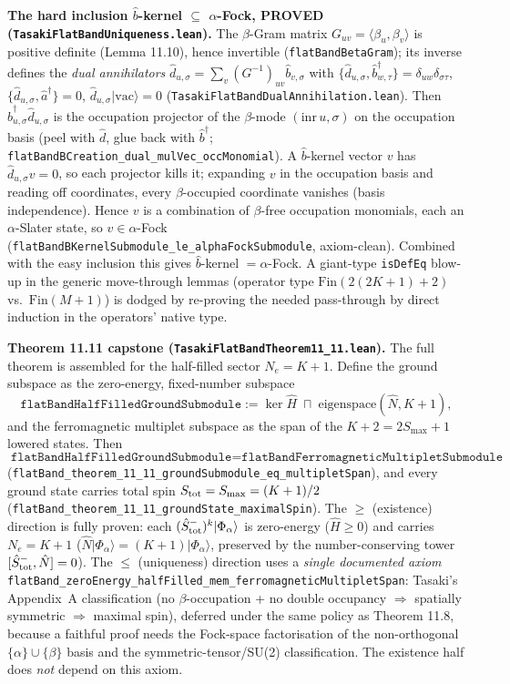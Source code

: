\documentclass[a4paper,11pt]{article}
\begin{document}
\medskip
\noindent\textbf{The hard inclusion $\hat b$-kernel $\subseteq$ $\alpha$-Fock,
PROVED (\texttt{TasakiFlatBandUniqueness.lean}).}  The $\beta$-Gram matrix
$G_{uv}=\langle\beta_u,\beta_v\rangle$ is positive definite (Lemma 11.10), hence
invertible (\texttt{flatBandBetaGram}); its inverse defines the \emph{dual
annihilators} $\hat d_{u,\sigma}=\sum_v(G^{-1})_{uv}\hat b_{v,\sigma}$ with
$\{\hat d_{u,\sigma},\hat b^\dagger_{w,\tau}\}=\delta_{uw}\delta_{\sigma\tau}$,
$\{\hat d_{u,\sigma},\hat a^\dagger\}=0$, $\hat d_{u,\sigma}|\mathrm{vac}\rangle=0$
(\texttt{TasakiFlatBandDualAnnihilation.lean}).  Then
$\hat b^\dagger_{u,\sigma}\hat d_{u,\sigma}$ is the occupation projector of the
$\beta$-mode $(\mathrm{inr}\,u,\sigma)$ on the occupation basis (peel with
$\hat d$, glue back with $\hat b^\dagger$;
\texttt{flatBandBCreation\_dual\_mulVec\_occMonomial}).  A $\hat b$-kernel vector
$v$ has $\hat d_{u,\sigma}v=0$, so each projector kills it; expanding $v$ in the
occupation basis and reading off coordinates, every $\beta$-occupied coordinate
vanishes (basis independence).  Hence $v$ is a combination of $\beta$-free
occupation monomials, each an $\alpha$-Slater state, so $v\in\alpha$-Fock
(\texttt{flatBandBKernelSubmodule\_le\_alphaFockSubmodule}, axiom-clean).  Combined
with the easy inclusion this gives $\hat b$-kernel $=\alpha$-Fock.  A giant-type
\texttt{isDefEq} blow-up in the generic move-through lemmas (operator type
$\mathrm{Fin}(2(2K{+}1){+}2)$ vs.\ $\mathrm{Fin}(M{+}1)$) is dodged by re-proving
the needed pass-through by direct induction in the operators' native type.

\medskip
\noindent\textbf{Theorem 11.11 capstone (\texttt{TasakiFlatBandTheorem11\_11.lean}).}
The full theorem is assembled for the half-filled sector $N_e = K+1$. Define the
ground subspace as the zero-energy, fixed-number subspace
\[
  \texttt{flatBandHalfFilledGroundSubmodule}
    := \ker\hat H \;\sqcap\; \mathrm{eigenspace}(\hat N, K+1),
\]
and the ferromagnetic multiplet subspace as the span of the $K+2 = 2S_{\max}+1$
lowered states. Then
\[
  \texttt{flatBandHalfFilledGroundSubmodule}
    = \texttt{flatBandFerromagneticMultipletSubmodule}
\]
(\texttt{flatBand\_theorem\_11\_11\_groundSubmodule\_eq\_multipletSpan}), and every
ground state carries total spin $S_{\rm tot} = S_{\max} = (K+1)/2$
(\texttt{flatBand\_theorem\_11\_11\_groundState\_maximalSpin}). The $\geq$
(existence) direction is fully proven: each $(\hat S^-_{\rm tot})^k|\Phi_\alpha
\rangle$ is zero-energy ($\hat H \geq 0$) and carries $N_e = K+1$
($\hat N|\Phi_\alpha\rangle = (K+1)|\Phi_\alpha\rangle$, preserved by the
number-conserving tower $[\hat S^-_{\rm tot}, \hat N] = 0$). The $\leq$ (uniqueness)
direction uses a \emph{single documented axiom}
\texttt{flatBand\_zeroEnergy\_halfFilled\_mem\_ferromagneticMultipletSpan}: Tasaki's
Appendix~A classification (no $\beta$-occupation + no double occupancy $\Rightarrow$
spatially symmetric $\Rightarrow$ maximal spin), deferred under the same policy as
Theorem 11.8, because a faithful proof needs the Fock-space
factorisation of the non-orthogonal $\{\alpha\}\cup\{\beta\}$ basis and the
symmetric-tensor/SU(2) classification. The existence half does \emph{not} depend on
this axiom.
\end{document}
